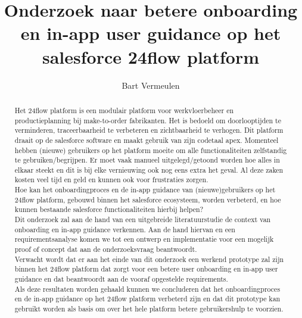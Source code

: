\documentclass{hogent-article}
\title{Onderzoek naar betere onboarding en in-app user guidance op het salesforce 24flow platform}
\author{Bart Vermeulen}
\begin{document}
\begin{abstract}
 
Het 24flow platform is een modulair platform voor werkvloerbeheer en productieplanning bij make-to-order fabrikanten. Het is bedoeld om 
doorlooptijden te verminderen, traceerbaarheid te verbeteren en zichtbaarheid te verhogen. Dit platform draait op de salesforce software en maakt gebruik van zijn codetaal apex.
Momenteel hebben (nieuwe) gebruikers op het platform moeite om alle functionaliteiten zelfstandig te gebruiken/begrijpen. Er moet vaak manueel uitgelegd/getoond worden hoe alles in elkaar steekt en dit is bij elke vernieuwing ook nog eens extra het geval. Al deze zaken kosten veel tijd en geld en kunnen ook voor frustraties zorgen.
\\

Hoe kan het onboardingproces en de in-app guidance van (nieuwe)gebruikers op het 24flow platform, gebouwd binnen het salesforce ecosysteem, worden verbeterd, en hoe kunnen bestaande salesforce functionaliteiten hierbij helpen?
\\

Dit onderzoek zal aan de hand van een uitgebreide literatuurstudie de context van onboarding en in-app guidance verkennen. Aan de hand hiervan en een requirementsanalyse komen we tot een ontwerp en implementatie voor een mogelijk proof of concept dat aan de onderzoeksvraag beantwoordt.
\\

Verwacht wordt dat er aan het einde van dit onderzoek een werkend prototype zal zijn binnen het 24flow platform dat zorgt voor een betere user onboarding en in-app user guidance en dat beantwoordt aan de vooraf opgestelde requirements.
\\

Als deze resultaten worden gehaald kunnen we concluderen dat het onboardingproces en de in-app guidance op het 24flow platform verbeterd zijn en dat dit prototype kan gebruikt worden als basis om over het hele platform betere gebruikershulp te voorzien.
\end{abstract}

\tableofcontents



\printbibliography[heading=bibintoc]
\end{document}
